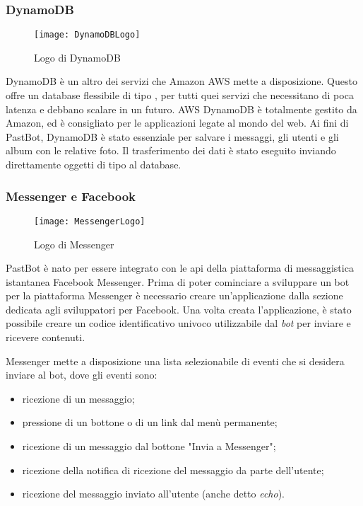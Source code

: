 \subsubsection{DynamoDB}
\begin{figure}[H]
  \centering
  \texttt{[image: DynamoDBLogo]}
  \caption{Logo di DynamoDB}
\end{figure}
DynamoDB è un altro dei servizi che Amazon AWS mette a disposizione. Questo
offre un database flessibile di tipo , per tutti
quei servizi che necessitano di poca latenza e debbano scalare in un futuro.
AWS DynamoDB è totalmente gestito da Amazon, ed è consigliato per le
applicazioni legate al mondo del web.
Ai fini di PastBot, DynamoDB è stato essenziale per salvare i messaggi, gli
utenti e gli album con le relative foto. Il trasferimento dei dati è stato
eseguito inviando direttamente oggetti di tipo
 al database.

\subsubsection{Messenger e Facebook}
\begin{figure}[H]
  \centering
  \texttt{[image: MessengerLogo]}
  \caption{Logo di Messenger}
\end{figure}
PastBot è nato per essere integrato con le \gls{api} della piattaforma di
messaggistica istantanea Facebook Messenger.
Prima di poter cominciare a sviluppare un bot per la piattaforma Messenger è
necessario creare un'applicazione dalla sezione dedicata agli sviluppatori per
Facebook.
Una volta creata l'applicazione, è stato possibile creare un codice
identificativo univoco utilizzabile dal \textit{bot} per inviare e ricevere
contenuti.

Messenger mette a disposizione una lista selezionabile di eventi che si desidera
inviare al bot, dove gli eventi sono:
\begin{itemize}
  \item ricezione di un messaggio;
  \item pressione di un bottone o di un link dal menù permanente;
  \item ricezione di un messaggio dal bottone "Invia a Messenger";
  \item ricezione della notifica di ricezione del messaggio da parte
dell'utente;
  \item ricezione del messaggio inviato all'utente (anche detto \textit{echo}).
\end{itemize}

